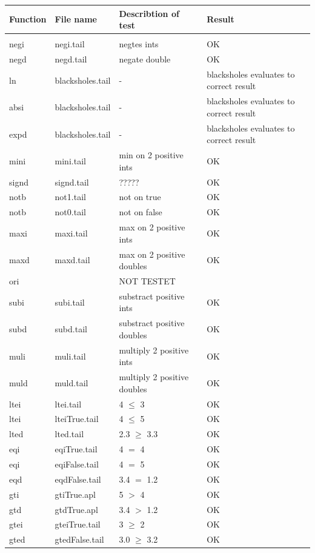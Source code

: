 \documentclass[11pt]{article}
\begin{document}
\begin{center}
\begin{tabular}{l l l l}
Function  		& File name		& Describtion of test			& Result \\ \hline \\
negi			& negi.tail			& negtes ints				& OK \\
negd 		& negd.tail			& negate double				& OK \\
ln 			& blacksholes.tail	& -					& blacksholes evaluates to correct result \\
absi 			& blacksholes.tail	& -					& blacksholes evaluates to correct result \\
expd 		& blacksholes.tail	& -					& blacksholes evaluates to correct result \\
mini 			& mini.tail			& min on 2 positive ints		& OK \\
signd 		& signd.tail			& ?????					& OK \\
notb			& not1.tail			& not on true				& OK \\
notb			& not0.tail			& not on false				& OK \\
maxi			& maxi.tail			& max on 2 positive ints		& OK \\
maxd		& maxd.tail		& max on 2 positive doubles	& OK \\
ori			& 				& NOT TESTET				&  \\
subi			& subi.tail			& substract positive ints		& OK \\
subd			& subd.tail			& substract positive doubles	& OK \\
muli			& muli.tail			& multiply 2 positive ints		& OK \\
muld			& muld.tail			& multiply 2 positive doubles	& OK \\
ltei			& ltei.tail			& 4 $\leq$ 3				& OK \\
ltei			& lteiTrue.tail		& 4 $\leq$ 5				& OK \\
lted			& lted.tail			& 2.3 $\geq$ 3.3				& OK \\
eqi			& eqiTrue.tail		& 4 $=$ 4					& OK \\
eqi 			& eqiFalse.tail		& 4 $=$ 5					& OK \\
eqd			& eqdFalse.tail		& 3.4 $=$ 1.2				& OK \\
gti			& gtiTrue.apl		& 5 $>$ 4					& OK \\
gtd			& gtdTrue.apl		& 3.4 $>$ 1.2				& OK \\
gtei			& gteiTrue.tail		& 3 $\geq$ 2				& OK \\
gted			& gtedFalse.tail		& 3.0 $\geq$ 3.2				& OK \\

\end{tabular}
\end{center}
\end{document}
